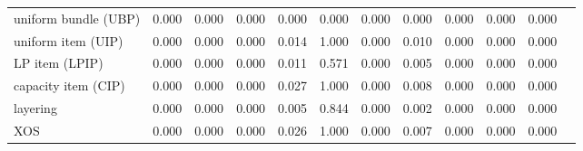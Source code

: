 \begin{table}[t]
\begin{tabular}{@{}lccccccccccc@{}}
    \midrule
    uniform bundle (UBP) & 0.000 & 0.000 & 0.000 & 0.000 & 0.000 & 0.000 & 0.000 & 0.000 & 0.000 & 0.000 \\
    uniform item (UIP) & 0.000 & 0.000 & 0.000 & 0.014 & 1.000 & 0.000 & 0.010 & 0.000 & 0.000 & 0.000 \\
    LP item (LPIP) & 0.000 & 0.000 & 0.000 & 0.011 & 0.571 & 0.000 & 0.005 & 0.000 & 0.000 & 0.000 \\
    capacity item (CIP) & 0.000 & 0.000 & 0.000 & 0.027 & 1.000 & 0.000 & 0.008 & 0.000 & 0.000 & 0.000 \\
    layering & 0.000 & 0.000 & 0.000 & 0.005 & 0.844 & 0.000 & 0.002 & 0.000 & 0.000 & 0.000 \\
    XOS & 0.000 & 0.000 & 0.000 & 0.026 & 1.000 & 0.000 & 0.007 & 0.000 & 0.000 & 0.000 \\
    \bottomrule
  \end{tabular}
\end{table}
